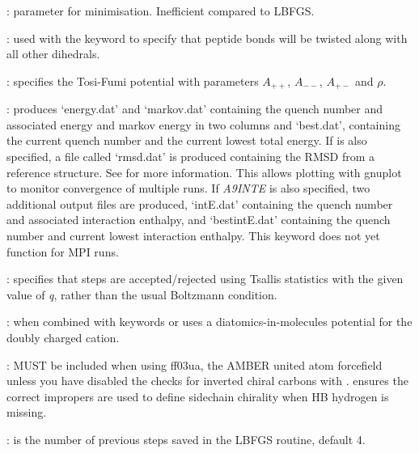 : parameter for {\/} minimisation. 
Inefficient compared to LBFGS.

: used with the {} keyword to specify that peptide bonds will be twisted along with all other dihedrals.


: specifies the Tosi-Fumi potential\cite{tosif64}
with parameters $A_{++}$, $A_{--}$, $A_{+-}$ and $\rho$.

: produces `energy.dat' and `markov.dat' containing the quench number and 
associated energy and markov energy in two columns and `best.dat', containing the current quench number and the current lowest
total energy. If {\/} is also specified, a file called `rmsd.dat' is produced containing the RMSD from a reference structure.
See {\/} for more information. This allows plotting with gnuplot to monitor convergence of multiple runs.
If {\it A9INTE} is also specified, two additional output files are produced, `intE.dat' containing the quench number and associated interaction
enthalpy, and `bestintE.dat' containing the quench number and current lowest interaction enthalpy. This keyword does not yet function for MPI runs.

: specifies that steps are accepted/rejected using Tsallis statistics with the
given value of {\it q\/}, rather than the usual Boltzmann condition.

: when combined with keywords {\/} or {\/}
uses a diatomics-in-molecules potential for the doubly charged cation.

: MUST be included when using ff03ua, the AMBER united atom forcefield unless you have disabled the checks for inverted chiral carbons
 with {\/}. {\/} ensures the correct impropers are used to define sidechain chirality when HB hydrogen is missing. 

: {\/} is the number of previous steps saved in the LBFGS routine,
default 4.

